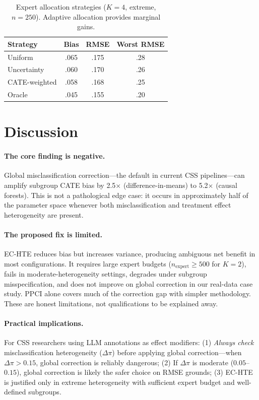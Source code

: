 \documentclass[11pt]{article}
\begin{document}
\begin{table}[t]
\centering
\small
\caption{Expert allocation strategies ($K{=}4$, extreme, $n{=}250$). Adaptive allocation provides marginal gains.}
\label{tab:allocation}
\begin{tabular}{@{}lccc@{}}
\toprule
Strategy & Bias & RMSE & Worst RMSE \\
\midrule
Uniform & .065 & .175 & .28 \\
Uncertainty & .060 & .170 & .26 \\
CATE-weighted & .058 & .168 & .25 \\
Oracle & .045 & .155 & .20 \\
\bottomrule
\end{tabular}
\end{table}

\section{Discussion}
\label{sec:discussion}

\paragraph{The core finding is negative.}
Global misclassification correction---the default in current CSS pipelines---can amplify subgroup CATE bias by 2.5$\times$ (difference-in-means) to 5.2$\times$ (causal forests).
This is not a pathological edge case: it occurs in approximately half of the parameter space whenever both misclassification and treatment effect heterogeneity are present.

\paragraph{The proposed fix is limited.}
EC-HTE reduces bias but increases variance, producing ambiguous net benefit in most configurations.
It requires large expert budgets ($n_{\text{expert}} \geq 500$ for $K{=}2$), fails in moderate-heterogeneity settings, degrades under subgroup misspecification, and does not improve on global correction in our real-data case study.
PPCI alone covers much of the correction gap with simpler methodology.
These are honest limitations, not qualifications to be explained away.

\paragraph{Practical implications.}
For CSS researchers using LLM annotations as effect modifiers:
(1) \emph{Always check} misclassification heterogeneity ($\Delta\pi$) before applying global correction---when $\Delta\pi > 0.15$, global correction is reliably dangerous;
(2) If $\Delta\pi$ is moderate ($0.05$--$0.15$), global correction is likely the safer choice on RMSE grounds;
(3) EC-HTE is justified only in extreme heterogeneity with sufficient expert budget and well-defined subgroups.
\end{document}
